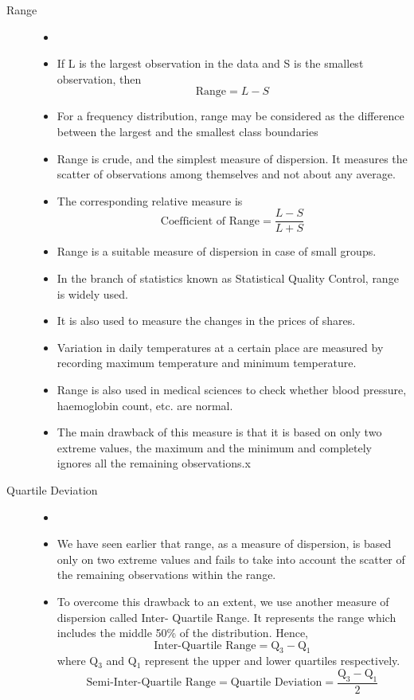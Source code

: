\documentclass[
10pt, %
a4paper, %
]{report}
\begin{document}
\begin{description}
\item[Range]
\begin{itemize}
\item[]
\item If L is the largest observation in the data and S is the smallest observation, then
\[\text{Range} = L - S\]
\item For a frequency distribution, range may be considered as the difference between the largest and the smallest class boundaries \item Range is crude, and the simplest measure of dispersion. It measures the scatter of observations among themselves and not about any average.
\item The corresponding relative measure is \
\[\text{Coefficient of Range} = \frac{L-S}{L+S}\]
\item Range is a suitable measure of dispersion in case of small groups.
\item In the branch of statistics known as Statistical Quality Control, range is widely used.
\item It is also used to measure the changes in the prices of shares.
\item Variation in daily temperatures at a certain place are measured by recording maximum temperature and minimum temperature.
\item Range is also used in medical sciences to check whether blood pressure, haemoglobin count, etc. are normal.
\item The main drawback of this measure is that it is based on only two extreme values, the maximum and the minimum and completely ignores all the remaining observations.x
\end{itemize}
\item[Quartile Deviation]
\begin{itemize}
\item[]
\item We have seen earlier that range, as a measure of dispersion, is based only on two extreme values and fails to take into account the scatter of the remaining observations within the range.
\item To overcome this drawback to an extent, we use another measure of dispersion called Inter- Quartile Range. It represents the range which includes the middle 50\% of the distribution. Hence,
\[\text{Inter-Quartile Range} = \mathrm{Q}_3 - \mathrm{Q}_1\]
where Q\(_3\) and Q\(_1\) represent the upper and lower quartiles respectively.
\[
\text{Semi-Inter-Quartile Range} = \text{Quartile Deviation} = \frac{\mathrm{Q}_3 - \mathrm{Q}_1}{2}
\]
\end{itemize}
\end{description}
\end{document}

